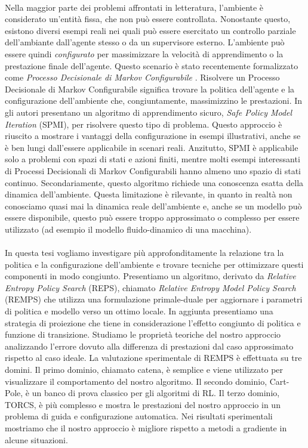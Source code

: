 \paragraph{} Nella maggior parte dei problemi affrontati in letteratura, l'ambiente è considerato un'entità fissa, che non può essere controllata. Nonostante questo, esistono diversi esempi reali nei quali può essere esercitato un controllo parziale dell'ambiante dall'agente stesso o da un supervisore esterno. L'ambiente può essere quindi \textit{configurato} per massimizzare la velocità di apprendimento o la prestazione finale dell'agente.
Questo scenario è stato recentemente formalizzato come \textit{Processo Decisionale di Markov Configurabile} \citep{cmdp}. Risolvere un Processo Decisionale di Markov Configurabile significa trovare la politica dell'agente e la configurazione dell'ambiente che, congiuntamente, massimizzino le prestazioni. In \citep{cmdp} gli autori presentano un algoritmo di apprendimento sicuro, \textit{Safe Policy Model Iteration} (SPMI), per risolvere questo tipo di problema. Questo approccio è riuscito a mostrare i vantaggi della configurazione in esempi illustrativi, anche se è ben lungi dall'essere applicabile in scenari reali. Anzitutto, SPMI è applicabile solo a problemi con spazi di stati e azioni finiti, mentre molti esempi interessanti di Processi Decisionali di Markov Configurabili hanno almeno uno spazio di stati continuo. Secondariamente, questo algoritmo richiede una conoscenza esatta della dinamica dell'ambiente. Questa limitazione è rilevante, in quanto in realtà non conosciamo quasi mai la dinamica reale dell'ambiente e, anche se un modello può essere disponibile, questo può essere troppo approssimato o complesso per essere utilizzato (ad esempio il modello fluido-dinamico di una macchina). \newline
\paragraph{} In questa tesi vogliamo investigare più approfonditamente la relazione tra la politica e la configurazione dell'ambiente e trovare tecniche per ottimizzare questi componenti in modo congiunto. Presentiamo un algoritmo, derivato da \textit{Relative Entropy Policy Search} \citep{reps} (REPS), chiamato \textit{Relative Entropy Model Policy Search} (REMPS) che utilizza una formulazione primale-duale per aggiornare i parametri di politica e modello verso un ottimo locale. In aggiunta presentiamo una strategia di proiezione che tiene in considerazione l'effetto congiunto di politica e funzione di transizione. Studiamo le proprietà teoriche del nostro approccio analizzando l'errore dovuto alla differenza di prestazioni dal caso approssimato rispetto al caso ideale. 
La valutazione sperimentale di REMPS è effettuata su tre domini. Il primo dominio, chiamato catena, è semplice e viene utilizzato per visualizzare il comportamento del nostro algoritmo. Il secondo dominio, Cart-Pole, è un banco di prova classico per gli algoritmi di RL. Il terzo dominio, TORCS, è più complesso e mostra le prestazioni del nostro approccio in un problema di guida e configurazione automatica. Nei risultati sperimentali mostriamo che il nostro approccio è migliore rispetto a metodi a gradiente in alcune situazioni.\newline 
